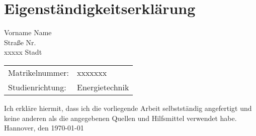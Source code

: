 \chapter*{Eigenständigkeitserklärung}
\thispagestyle{empty}
\vspace{1cm}

\begin{flushleft}

Vorname Name \\
Straße Nr. \\
xxxxx Stadt

\vspace{1.0cm}

\begin{tabular}{@{} l l}
Matrikelnummer:  & xxxxxxx \\
Studienrichtung: & Energietechnik \\
\end{tabular}

\vspace{3.0cm}

Ich erkläre hiermit, dass ich die vorliegende Arbeit selbstständig
angefertigt und keine anderen als die angegebenen Quellen und
Hilfsmittel verwendet habe. \\ [2cm]

Hannover, den \today

\end{flushleft}
